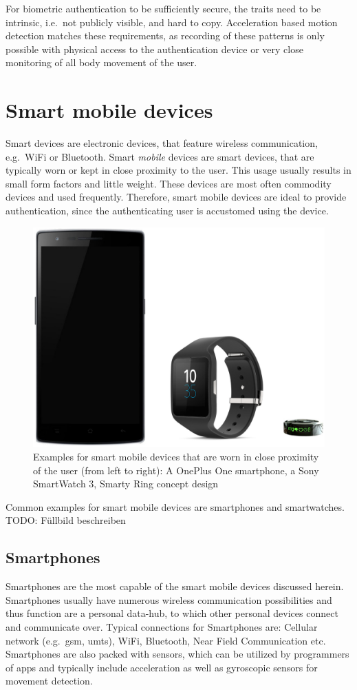 For biometric authentication to be sufficiently secure, the traits need to be intrinsic, i.e.\ not publicly visible, and hard to copy. Acceleration based motion detection matches these requirements, as recording of these patterns is only possible with physical access to the authentication device or very close monitoring of all body movement of the user.

\section{Smart mobile devices}
Smart devices are electronic devices, that feature wireless communication, e.g.\ WiFi or Bluetooth. Smart \emph{mobile} devices are smart devices, that are typically worn or kept in close proximity to the user. This usage usually results in small form factors and little weight. These devices are most often commodity devices and used frequently. Therefore, smart mobile devices are ideal to provide authentication, since the authenticating user is accustomed using the device.

\begin{figure}
    \centering
    \includegraphics[width=\textwidth]{figures/SmartDevices.png}
    \caption{Examples for smart mobile devices that are worn in close proximity of the user (from left to right): A OnePlus One smartphone, a Sony SmartWatch 3, Smarty Ring concept design}
    \label{fig:smartdevices}
\end{figure}
Common examples for smart mobile devices are smartphones and smartwatches.
TODO: Füllbild beschreiben

\subsection{Smartphones}
Smartphones are the most capable of the smart mobile devices discussed herein. Smartphones usually have numerous wireless communication possibilities and thus function are a personal data-hub, to which other personal devices connect and communicate over. Typical connections for Smartphones are: Cellular network (e.g.\ \acrshort{gsm}, \acrshort{umts}), WiFi, Bluetooth, Near Field Communication etc. Smartphones are also packed with sensors, which can be utilized by programmers of \Glspl{app} and typically include acceleration as well as gyroscopic sensors for movement detection.

